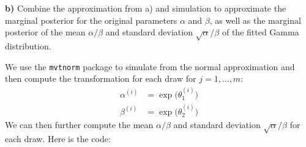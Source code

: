 \documentclass[
  letterpaper,
  DIV=11,
  numbers=noendperiod]{scrartcl}
\begin{document}
\textbf{b)} Combine the approximation from a) and simulation to
approximate the marginal posterior for the original parameters
\(\alpha\) and \(\beta\), as well as the marginal posterior of the mean
\(\alpha/\beta\) and standard deviation \(\sqrt{\alpha}/\beta\) of the
fitted Gamma distribution.

\begin{tcolorbox}[enhanced jigsaw, arc=.35mm, bottomrule=.15mm, bottomtitle=1mm, breakable, colback=white, colbacktitle=quarto-callout-note-color!10!white, colframe=quarto-callout-note-color-frame, coltitle=black, left=2mm, leftrule=.75mm, opacityback=0, opacitybacktitle=0.6, rightrule=.15mm, title={Solution}, titlerule=0mm, toprule=.15mm, toptitle=1mm]

We use the \texttt{mvtnorm} package to simulate from the normal
approximation and then compute the transformation for each draw for
\(j=1,\ldots,m\): \[
\begin{aligned}
\alpha^{(i)} &= \exp\big(\theta_1^{(i)} \big) \\
\beta^{(i)} &= \exp\big(\theta_2^{(i)} \big)
\end{aligned}
\] We can then further compute the mean \(\alpha/\beta\) and standard
deviation \(\sqrt{\alpha}/\beta\) for each draw. Here is the code:


\end{tcolorbox}
\end{document}
